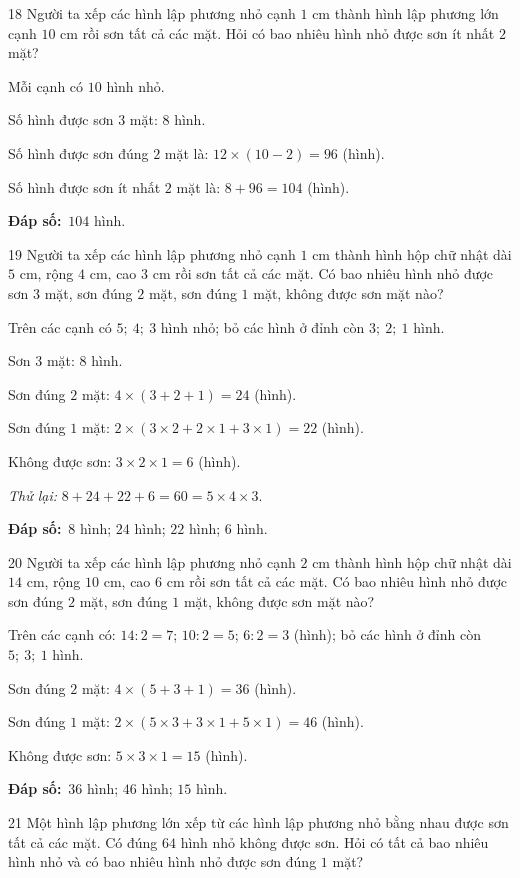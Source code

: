 \documentclass[11pt]{article}
\newif\ifsol \solfalse
\providecommand{\AnsWord}{Đáp số}
\newcommand{\dapso}[1]{\par\textbf{\AnsWord:}\ #1}
\newcommand{\probsol}[1]{%
  \begin{lrbox}{\solmeasure}\begin{minipage}{\dimexpr\linewidth-24pt\relax}#1\end{minipage}\end{lrbox}%
  \ifsol
    \begin{solbox}#1\end{solbox}%
  \else
    \setlength{\solht}{\dimexpr\ht\solmeasure+\dp\solmeasure+0.85cm\relax}%
    \ifdim\solht<1.35cm\setlength{\solht}{1.35cm}\fi
    \begin{tcolorbox}[colback=white,colframe=Line,boxrule=0.8pt,arc=5pt,
      left=8pt,right=8pt,top=4pt,bottom=4pt,height=\solht]{\footnotesize\color{Slate}\itshape\WorkWord}\end{tcolorbox}%
  \fi}
\newcommand{\gap}{\vspace{0.3cm}}
\def\WorkWord{Bài làm:}
\def\AnsWord{Đáp số}
\begin{document}
\gap
\begin{probbox}{18}{\relax}
Người ta xếp các hình lập phương nhỏ cạnh $1$ cm thành hình lập phương lớn cạnh $10$ cm rồi sơn tất cả các mặt. Hỏi có bao nhiêu hình nhỏ được sơn ít nhất $2$ mặt?
\end{probbox}
\probsol{
Mỗi cạnh có $10$ hình nhỏ.\par
Số hình được sơn $3$ mặt: $8$ hình.\par
Số hình được sơn đúng $2$ mặt là: $12\times(10-2)=96$ (hình).\par
Số hình được sơn ít nhất $2$ mặt là: $8+96=104$ (hình).
\dapso{$104$ hình.}}
\gap
\begin{probbox}{19}{\relax}
Người ta xếp các hình lập phương nhỏ cạnh $1$ cm thành hình hộp chữ nhật dài $5$ cm, rộng $4$ cm, cao $3$ cm rồi sơn tất cả các mặt. Có bao nhiêu hình nhỏ được sơn $3$ mặt, sơn đúng $2$ mặt, sơn đúng $1$ mặt, không được sơn mặt nào?
\end{probbox}
\probsol{
Trên các cạnh có $5;\ 4;\ 3$ hình nhỏ; bỏ các hình ở đỉnh còn $3;\ 2;\ 1$ hình.\par
Sơn $3$ mặt: $8$ hình.\par
Sơn đúng $2$ mặt: $4\times(3+2+1)=24$ (hình).\par
Sơn đúng $1$ mặt: $2\times(3\times2+2\times1+3\times1)=22$ (hình).\par
Không được sơn: $3\times2\times1=6$ (hình).\par
\emph{Thử lại:} $8+24+22+6=60=5\times4\times3$.
\dapso{$8$ hình; $24$ hình; $22$ hình; $6$ hình.}}
\gap
\begin{probbox}{20}{\relax}
Người ta xếp các hình lập phương nhỏ cạnh $2$ cm thành hình hộp chữ nhật dài $14$ cm, rộng $10$ cm, cao $6$ cm rồi sơn tất cả các mặt. Có bao nhiêu hình nhỏ được sơn đúng $2$ mặt, sơn đúng $1$ mặt, không được sơn mặt nào?
\end{probbox}
\probsol{
Trên các cạnh có: $14:2=7$; $10:2=5$; $6:2=3$ (hình); bỏ các hình ở đỉnh còn $5;\ 3;\ 1$ hình.\par
Sơn đúng $2$ mặt: $4\times(5+3+1)=36$ (hình).\par
Sơn đúng $1$ mặt: $2\times(5\times3+3\times1+5\times1)=46$ (hình).\par
Không được sơn: $5\times3\times1=15$ (hình).
\dapso{$36$ hình; $46$ hình; $15$ hình.}}
\gap
\begin{probbox}{21}{\relax}
Một hình lập phương lớn xếp từ các hình lập phương nhỏ bằng nhau được sơn tất cả các mặt. Có đúng $64$ hình nhỏ không được sơn. Hỏi có tất cả bao nhiêu hình nhỏ và có bao nhiêu hình nhỏ được sơn đúng $1$ mặt?
\end{probbox}
\end{document}
